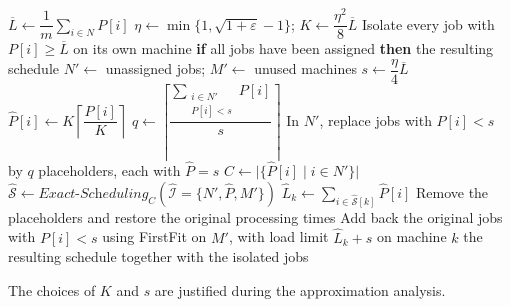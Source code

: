 \documentclass[12pt,a4paper]{article}
\theoremstyle{definition}
\theoremstyle{plain}
\begin{document}
\begin{algorithm}[htbp]
\caption{$\textit{PTAS-Scheduling}(\mathcal{I},\varepsilon)$}
\begin{algorithmic}[1]
\State $\overline{L}\gets\dfrac{1}{m}\sum_{i\in N}P[i]$
\State $\eta\gets\min\{1,\sqrt{1+\varepsilon}-1\}$; $K\gets\dfrac{\eta^2}{8}\overline{L}$
\State Isolate every job with $P[i]\geq\overline{L}$ on its own machine
\State \textbf{if} all jobs have been assigned \textbf{then} \Return the resulting schedule
\State $N'\gets$ unassigned jobs; $M'\gets$ unused machines
\State $s\gets\dfrac{\eta}{4}\overline{L}$
\State $\widehat{P}[i]\gets K\left\lceil\dfrac{P[i]}{K}\right\rceil$
\EndFor
\State $q\gets\left\lceil\dfrac{\sum_{\substack{i\in N'\\P[i]<s}}P[i]}{s}\right\rceil$
\State In $N'$, replace jobs with $P[i]<s$ by $q$ placeholders, each with $\widehat{P}=s$
\State $C\gets\bigl|\{\widehat{P}[i]\mid i\in N'\}\bigr|$
\State $\widehat{\mathcal{S}}\gets\textit{Exact-Scheduling}_C(\widehat{\mathcal{I}}=\{N',\widehat{P},M'\})$
\State $\widehat{L}_k\gets\displaystyle\sum_{i\in\widehat{\mathcal{S}}[k]}\widehat{P}[i]$
\State Remove the placeholders and restore the original processing times
\State Add back the original jobs with $P[i]<s$ using FirstFit on $M'$,
\Statex \hspace{\algorithmicindent} with load limit $\widehat{L}_k+s$ on machine $k$
\State \Return the resulting schedule together with the isolated jobs
\end{algorithmic}
\end{algorithm}

The choices of $K$ and $s$ are justified during the approximation analysis.
\end{document}
